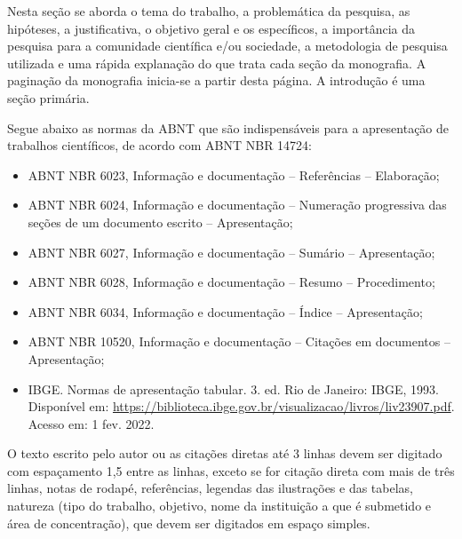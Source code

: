 Nesta seção se aborda o tema do trabalho, a problemática da pesquisa, as
hipóteses, a justificativa, o objetivo geral e os específicos, a importância
da pesquisa para a comunidade científica e/ou sociedade, a metodologia de
pesquisa utilizada e uma rápida explanação do que trata cada seção da
monografia. A paginação da monografia inicia-se a partir desta página. A
introdução é uma seção primária.

Segue abaixo as normas da ABNT que são indispensáveis para a apresentação de
trabalhos científicos, de acordo com ABNT NBR 14724:

\begin{itemize}
  \item ABNT NBR 6023, Informação e documentação -- Referências -- Elaboração;
  \item ABNT NBR 6024, Informação e documentação -- Numeração progressiva das
        seções de um documento escrito -- Apresentação;
  \item ABNT NBR 6027, Informação e documentação -- Sumário -- Apresentação;
  \item ABNT NBR 6028, Informação e documentação -- Resumo -- Procedimento;
  \item ABNT NBR 6034, Informação e documentação -- Índice -- Apresentação;
  \item ABNT NBR 10520, Informação e documentação -- Citações em documentos --
        Apresentação;
  \item IBGE. Normas de apresentação tabular. 3. ed. Rio de Janeiro: IBGE, 1993.
        Disponível em:
        \url{https://biblioteca.ibge.gov.br/visualizacao/livros/liv23907.pdf}.
        Acesso em: 1 fev. 2022.
\end{itemize}

O texto escrito pelo autor ou as citações diretas até 3 linhas devem ser
digitado com espaçamento 1,5 entre as linhas, exceto se for citação direta com
mais de três linhas, notas de rodapé, referências, legendas das ilustrações e
das tabelas, natureza (tipo do trabalho, objetivo, nome da instituição a que é
submetido e área de concentração), que devem ser digitados em espaço simples.

\textopadrao
